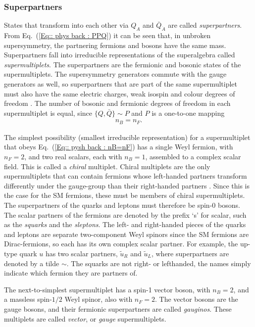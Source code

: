 \documentclass[twoside,english]{uiofysmaster}
\begin{document}
\subsubsection{Superpartners}\label{Sec:: phys back : Superpartners}

States that transform into each other via $Q_A$ and $\bar{Q}_{\dot{A}}$ are called \textit{superpartners}. From Eq.~(\ref{Eq:: phys back : PPQ}) it can be seen that, in unbroken supersymmetry, the partnering fermions and bosons have the same mass. Superpartners fall into irreducible representations of the superalgebra called \textit{supermultiplets}. The superpartners are the fermionic and bosonic states of the supermultiplets. The supersymmetry generators commute with the gauge generators as well, so superpartners that are part of the same supermultiplet must also have the same electric charges, weak isospin and colour degrees of freedom \cite{Martin:1997ns}. The number of bosonic and fermionic degrees of freedom in each supermultiplet is equal, since $\{Q, \bar{Q}\} \sim P$ and $P$ is a one-to-one mapping 
\begin{align}\label{Eq:: pysh back : nB=nF}
n_B = n_F.
\end{align}

The simplest possibility (smallest irreducible representation) for a supermultiplet that obeys Eq.~(\ref{Eq:: pysh back : nB=nF}) has a single Weyl fermion, with $n_F =2$, and two real scalars, each with $n_B=1$, assembled to a complex scalar field. This is called a \textit{chiral} multiplet. Chiral multiplets are the only supermultiplets that can contain fermions whose left-handed partners transform differently under the gauge-group than their right-handed partners \cite{Martin:1997ns}. Since this is the case for the SM fermions, these must be members of chiral supermultiplets. The superpartners of the quarks and leptons must therefore be spin-0 bosons. The scalar partners of the fermions are denoted by the prefix `s' for scalar, such as the \textit{squarks} and the \textit{sleptons}. The left- and right-handed pieces of the quarks and leptons are separate two-component Weyl spinors since the SM fermions are Dirac-fermions, so each has its own complex scalar partner. For example, the up-type quark $u$ has two scalar partners, $\widetilde{u}_R$ and $\widetilde{u}_L$, where superpartners are denoted by a tilde $\sim$. The squarks are not right- or lefthanded, the names simply indicate which fermion they are partners of.

The next-to-simplest supermultiplet has a spin-1 vector boson, with $n_B=2$, and a massless spin-$1/2$ Weyl spinor, also with $n_F=2$. The vector bosons are the gauge bosons, and their fermionic superpartners are called \textit{gauginos}. These multiplets are called \textit{vector}, or \textit{gauge} supermultiplets. 
\end{document}
